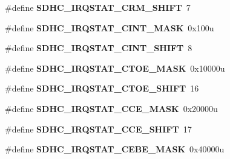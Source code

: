 \begin{DoxyCompactItemize}
\item 
\#define {\bfseries S\+D\+H\+C\+\_\+\+I\+R\+Q\+S\+T\+A\+T\+\_\+\+C\+R\+M\+\_\+\+S\+H\+I\+FT}~7\hypertarget{group__SDHC__Register__Masks_gab7f485316bf04aaf4f729e69cd6acb01}{}\label{group__SDHC__Register__Masks_gab7f485316bf04aaf4f729e69cd6acb01}

\item 
\#define {\bfseries S\+D\+H\+C\+\_\+\+I\+R\+Q\+S\+T\+A\+T\+\_\+\+C\+I\+N\+T\+\_\+\+M\+A\+SK}~0x100u\hypertarget{group__SDHC__Register__Masks_ga2d0fb2d9616c809a5610a537d015ddb6}{}\label{group__SDHC__Register__Masks_ga2d0fb2d9616c809a5610a537d015ddb6}

\item 
\#define {\bfseries S\+D\+H\+C\+\_\+\+I\+R\+Q\+S\+T\+A\+T\+\_\+\+C\+I\+N\+T\+\_\+\+S\+H\+I\+FT}~8\hypertarget{group__SDHC__Register__Masks_gaf1eb220f726f19220232275f4ba4c42b}{}\label{group__SDHC__Register__Masks_gaf1eb220f726f19220232275f4ba4c42b}

\item 
\#define {\bfseries S\+D\+H\+C\+\_\+\+I\+R\+Q\+S\+T\+A\+T\+\_\+\+C\+T\+O\+E\+\_\+\+M\+A\+SK}~0x10000u\hypertarget{group__SDHC__Register__Masks_gac60476a4a3d496ff5f2527af5bbeb006}{}\label{group__SDHC__Register__Masks_gac60476a4a3d496ff5f2527af5bbeb006}

\item 
\#define {\bfseries S\+D\+H\+C\+\_\+\+I\+R\+Q\+S\+T\+A\+T\+\_\+\+C\+T\+O\+E\+\_\+\+S\+H\+I\+FT}~16\hypertarget{group__SDHC__Register__Masks_gac22f4d05d6dd0b5bb27ac12636e46180}{}\label{group__SDHC__Register__Masks_gac22f4d05d6dd0b5bb27ac12636e46180}

\item 
\#define {\bfseries S\+D\+H\+C\+\_\+\+I\+R\+Q\+S\+T\+A\+T\+\_\+\+C\+C\+E\+\_\+\+M\+A\+SK}~0x20000u\hypertarget{group__SDHC__Register__Masks_ga1d6ab12c7170114b3836f7dfd0cb085a}{}\label{group__SDHC__Register__Masks_ga1d6ab12c7170114b3836f7dfd0cb085a}

\item 
\#define {\bfseries S\+D\+H\+C\+\_\+\+I\+R\+Q\+S\+T\+A\+T\+\_\+\+C\+C\+E\+\_\+\+S\+H\+I\+FT}~17\hypertarget{group__SDHC__Register__Masks_gaf568e7274912a3580885d9852483470f}{}\label{group__SDHC__Register__Masks_gaf568e7274912a3580885d9852483470f}

\item 
\#define {\bfseries S\+D\+H\+C\+\_\+\+I\+R\+Q\+S\+T\+A\+T\+\_\+\+C\+E\+B\+E\+\_\+\+M\+A\+SK}~0x40000u\hypertarget{group__SDHC__Register__Masks_ga3176b0a0930022da225cbb55238688da}{}\label{group__SDHC__Register__Masks_ga3176b0a0930022da225cbb55238688da}


\end{DoxyCompactItemize}
